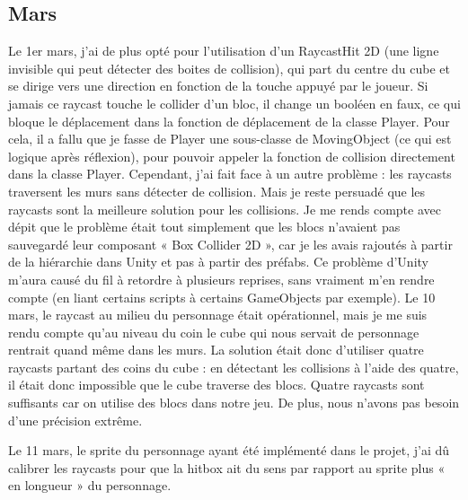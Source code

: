 \documentclass[]{extarticle}
\begin{document}
\begin{spacing}{1.25}
\subsection{Mars}
\bigbreak
Le 1er mars, j’ai de plus opté pour l’utilisation d’un RaycastHit 2D (une ligne invisible qui peut détecter des boites de collision), qui part du centre du cube et se dirige vers une direction en fonction de la touche appuyé par le joueur. Si jamais ce raycast touche le collider d’un bloc, il change un booléen en faux, ce qui bloque le déplacement dans la fonction de déplacement de la classe Player. Pour cela, il a fallu que je fasse de Player une sous-classe de MovingObject (ce qui est logique après réflexion), pour pouvoir appeler la fonction de collision directement dans la classe Player.
\bigbreak
Cependant, j’ai fait face à un autre problème : les raycasts traversent les murs sans détecter de collision. Mais je reste persuadé que les raycasts sont la meilleure solution pour les collisions. Je me rends compte avec dépit que le problème était tout simplement que les blocs n’avaient pas sauvegardé leur composant « Box Collider 2D », car je les avais rajoutés à partir de la hiérarchie dans Unity et pas à partir des préfabs. Ce problème d’Unity m’aura causé du fil à retordre à plusieurs reprises, sans vraiment m’en rendre compte (en liant certains scripts à certains GameObjects par exemple).
\bigbreak
Le 10 mars, le raycast au milieu du personnage était opérationnel, mais je me suis rendu compte qu’au niveau du coin le cube qui nous servait de personnage rentrait quand même dans les murs. La solution était donc d’utiliser quatre raycasts partant des coins du cube : en détectant les collisions à l’aide des quatre, il était donc impossible que le cube traverse des blocs.
Quatre raycasts sont suffisants car on utilise des blocs dans notre jeu. De plus, nous n’avons pas besoin d’une précision extrême.
\bigbreak

Le 11 mars, le sprite du personnage ayant été implémenté dans le projet, j’ai dû calibrer les raycasts pour que la hitbox ait du sens par rapport au sprite plus « en longueur » du personnage.
\newpage


\end{spacing}
\end{document}
